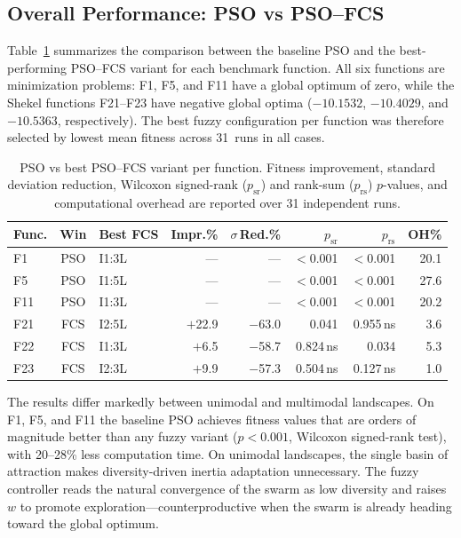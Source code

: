 \documentclass[conference]{IEEEtran}
\newcommand{\new}[1]{{\color{red}#1}}
\begin{document}
\subsection{Overall Performance: PSO vs PSO--FCS}
\label{subsec:overall_results}

Table~\ref{tab:pso_vs_fcs} summarizes the comparison between the baseline PSO and the best-performing PSO--FCS variant for each benchmark function. All six functions are minimization problems: F1, F5, and F11 have a global optimum of zero, while the Shekel functions F21--F23 have negative global optima ($-10.1532$, $-10.4029$, and $-10.5363$, respectively). The best fuzzy configuration per function was therefore selected by lowest mean fitness across 31~runs in all cases.


\begin{table}[ht]
    \caption{\new{PSO vs best PSO--FCS variant per function. Fitness improvement, standard deviation reduction, Wilcoxon signed-rank ($p_{\text{sr}}$) and rank-sum ($p_{\text{rs}}$) $p$-values, and computational overhead are reported over 31 independent runs.}}
    \label{tab:pso_vs_fcs}
    \centering
    \footnotesize
    \setlength{\tabcolsep}{3pt}
    \begin{tabular}{@{}lclrrrrr@{}}
    \toprule
    Func. & Win & Best FCS & Impr.\% & $\sigma$\,Red.\% & $p_{\text{sr}}$ & $p_{\text{rs}}$ & OH\% \\
    \midrule
    F1  & PSO & I1:3L & --- & --- & $<$0.001\rlap{***} & $<$0.001\rlap{***} & 20.1 \\
    F5  & PSO & I1:5L & --- & --- & $<$0.001\rlap{***} & $<$0.001\rlap{***} & 27.6 \\
    F11 & PSO & I1:3L & --- & --- & $<$0.001\rlap{***} & $<$0.001\rlap{***} & 20.2 \\
    F21 & FCS & I2:5L & $+$22.9 & $-$63.0 & 0.041\rlap{*}     & 0.955\,ns         & 3.6 \\
    F22 & FCS & I1:3L & $+$6.5  & $-$58.7 & 0.824\,ns         & 0.034\rlap{*}     & 5.3 \\
    F23 & FCS & I2:3L & $+$9.9  & $-$57.3 & 0.504\,ns         & 0.127\,ns         & 1.0 \\
    \bottomrule
    \end{tabular}
\end{table}

The results differ markedly between unimodal and multimodal landscapes. On F1, F5, and F11 the baseline PSO achieves fitness values that are orders of magnitude better than any fuzzy variant ($p < 0.001$, Wilcoxon signed-rank test), with 20--28\% less computation time. On unimodal landscapes, the single basin of attraction makes diversity-driven inertia adaptation unnecessary. The fuzzy controller reads the natural convergence of the swarm as low diversity and raises~$w$ to promote exploration---counterproductive when the swarm is already heading toward the global optimum.
\end{document}
